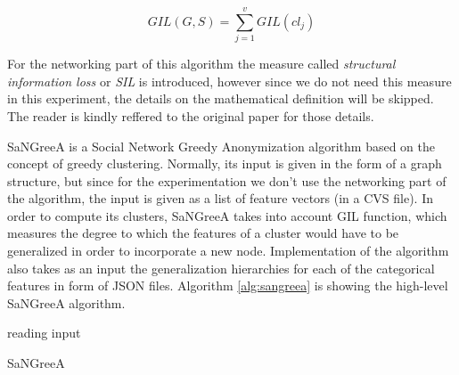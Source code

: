 \documentclass{article}
\begin{document}
\begin{equation*}
	GIL(G,S)=\sum_{j=1}^{v}GIL(cl_j)
\end{equation*}

For the networking part of this algorithm the measure called \textit{structural information loss} or \textit{SIL} is introduced, however since we do not need this measure in this experiment, the details on the mathematical definition will be skipped. The reader is kindly reffered to the original paper \cite{campan2009data} for those details.

SaNGreeA is a Social Network Greedy Anonymization algorithm based on the concept of greedy clustering. Normally, its input is given in the form of a graph structure, but since for the experimentation we don't use the networking part of the algorithm, the input is given as a list of feature vectors (in a CVS file). In order to compute its clusters, SaNGreeA takes into account GIL function, which measures the degree to which the features of a cluster would have to be generalized in order to incorporate a new node. Implementation of the algorithm also takes as an input the generalization hierarchies for each of the categorical features in form of JSON files. Algorithm \vref{alg:sangreea} is showing the high-level SaNGreeA algorithm.
\\

\begin{algorithm}[H]
	reading input\;
	\caption{SaNGreeA}\label{alg:sangreea}
 	
\end{algorithm}
\end{document}
